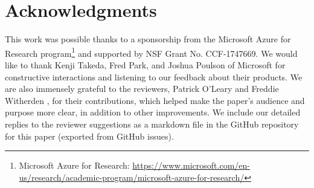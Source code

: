 \documentclass[10pt,journal,compsoc]{IEEEtran}
\begin{document}
\section*{Acknowledgments}

This work was possible thanks to a sponsorship from the Microsoft Azure for Research program\footnote{Microsoft Azure for Research: \url{https://www.microsoft.com/en-us/research/academic-program/microsoft-azure-for-research/}} and supported by NSF Grant No. CCF-1747669.
We would like to thank Kenji Takeda, Fred Park, and Joshua Poulson of Microsoft for constructive interactions and listening to our feedback about their products. 
We are also immensely grateful to the reviewers, Patrick O'Leary \cite{oleary_2019} and Freddie Witherden \cite{witherden_2019}, for their contributions, which helped make the paper's audience and purpose more clear, in addition to other improvements.
We include our detailed replies to the reviewer suggestions as a markdown file in the GitHub repository for this paper (exported from GitHub issues).



%
\end{document}
